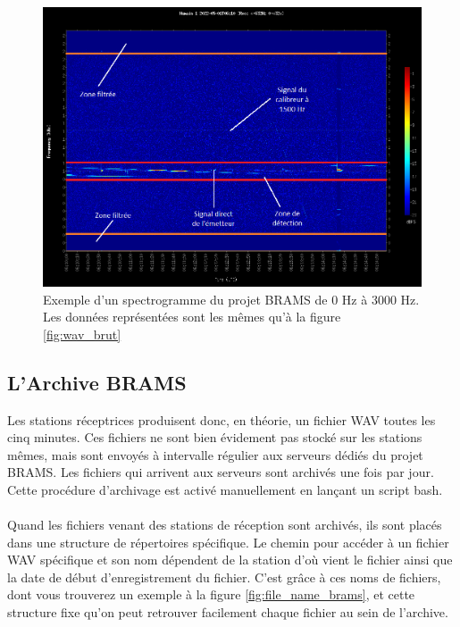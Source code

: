 \documentclass[11pt]{article}
\begin{document}
\begin{figure}[h]
    \begin{center}
        \includegraphics[scale=0.81]{RAD_BEDOUR_20220501_0610_BEHUMA_SYS001.png}
        \caption{Exemple d'un spectrogramme du projet BRAMS de 0 Hz à 3000 Hz. Les données représentées sont les mêmes qu'à la figure \ref{fig:wav_brut}}
        \label{fig:spectro_brams-b}
    \end{center}
\end{figure}

\subsection{L'Archive BRAMS}

Les stations réceptrices produisent donc, en théorie, un fichier WAV toutes les cinq minutes.
Ces fichiers ne sont bien évidement pas stocké sur les stations mêmes, mais sont envoyés à intervalle régulier aux serveurs dédiés du projet BRAMS.
Les fichiers qui arrivent aux serveurs sont archivés une fois par jour.
Cette procédure d'archivage est activé manuellement en lançant un script bash.\\
\\
Quand les fichiers venant des stations de réception sont archivés, ils sont placés dans une structure de répertoires spécifique.
Le chemin pour accéder à un fichier WAV spécifique et son nom dépendent de la station d'où vient le fichier ainsi que la date de début d'enregistrement du fichier.
C'est grâce à ces noms de fichiers, dont vous trouverez un exemple à la figure \ref{fig:file_name_brams}, et cette structure fixe qu'on peut retrouver facilement chaque fichier au sein de l'archive.\\
\end{document}
